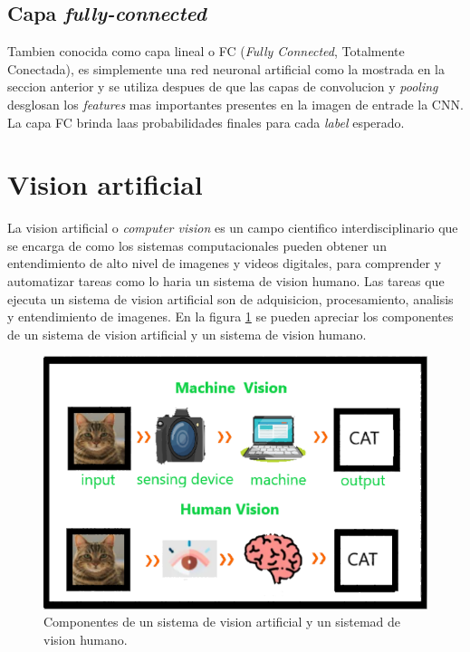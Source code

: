 \subsection{Capa \textit{fully-connected}}
Tambien conocida como capa lineal o FC (\textit{Fully Connected}, Totalmente Conectada), es simplemente una red neuronal artificial como la
mostrada en la seccion anterior y se utiliza despues de que las capas de convolucion y \textit{pooling} desglosan los \textit{features} mas importantes presentes en la imagen de entrade  la CNN. La capa FC brinda laas probabilidades finales para cada \textit{label} esperado. 

\section{Vision artificial}
La vision artificial o \textit{computer vision} es un campo cientifico interdisciplinario que se encarga de como los sistemas computacionales pueden obtener un entendimiento de alto nivel de imagenes y videos digitales, para comprender y automatizar tareas como lo haria un sistema de vision humano. Las tareas que ejecuta un sistema de vision artificial son de adquisicion, procesamiento, analisis y entendimiento de imagenes. En la figura \ref{fig:mv_comp} se pueden apreciar los componentes de un sistema de vision artificial y un sistema de vision humano.

\begin{figure}[h]
	\centering
	\includegraphics[scale=0.3]{./Figures/mv_comp.png}
	\caption{Componentes de un sistema de vision artificial y un sistemad de vision humano.}
	\label{fig:mv_comp}
\end{figure}

